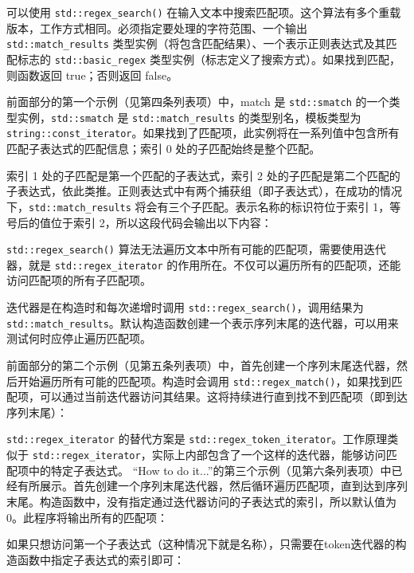 可以使用 \verb|std::regex_search()| 在输入文本中搜索匹配项。这个算法有多个重载版本，工作方式相同。必须指定要处理的字符范围、一个输出 \verb|std::match_results| 类型实例（将包含匹配结果）、一个表示正则表达式及其匹配标志的 \verb|std::basic_regex| 类型实例（标志定义了搜索方式）。如果找到匹配，则函数返回 true；否则返回 false。

前面部分的第一个示例（见第四条列表项）中，match 是 \verb|std::smatch| 的一个类型实例，\verb|std::smatch| 是 \verb|std::match_results| 的类型别名，模板类型为 \verb|string::const_iterator|。如果找到了匹配项，此实例将在一系列值中包含所有匹配子表达式的匹配信息；索引 0 处的子匹配始终是整个匹配。

索引 1 处的子匹配是第一个匹配的子表达式，索引 2 处的子匹配是第二个匹配的子表达式，依此类推。正则表达式中有两个捕获组（即子表达式），在成功的情况下，\verb|std::match_results| 将会有三个子匹配。表示名称的标识符位于索引 1，等号后的值位于索引 2，所以这段代码会输出以下内容：


\verb|std::regex_search()| 算法无法遍历文本中所有可能的匹配项，需要使用迭代器，就是 \verb|std::regex_iterator| 的作用所在。不仅可以遍历所有的匹配项，还能访问匹配项的所有子匹配项。

迭代器是在构造时和每次递增时调用 \verb|std::regex_search()|，调用结果为 \verb|std::match_results|。默认构造函数创建一个表示序列末尾的迭代器，可以用来测试何时应停止遍历匹配项。

前面部分的第二个示例（见第五条列表项）中，首先创建一个序列末尾迭代器，然后开始遍历所有可能的匹配项。构造时会调用 \verb|std::regex_match()|，如果找到匹配项，可以通过当前迭代器访问其结果。这将持续进行直到找不到匹配项（即到达序列末尾）：


\verb|std::regex_iterator| 的替代方案是 \verb|std::regex_token_iterator|。工作原理类似于 \verb|std::regex_iterator|，实际上内部包含了一个这样的迭代器，能够访问匹配项中的特定子表达式。 “How to do it...”的第三个示例（见第六条列表项）中已经有所展示。首先创建一个序列末尾迭代器，然后循环遍历匹配项，直到达到序列末尾。构造函数中，没有指定通过迭代器访问的子表达式的索引，所以默认值为 0。此程序将输出所有的匹配项：


如果只想访问第一个子表达式（这种情况下就是名称），只需要在token迭代器的构造函数中指定子表达式的索引即可：

